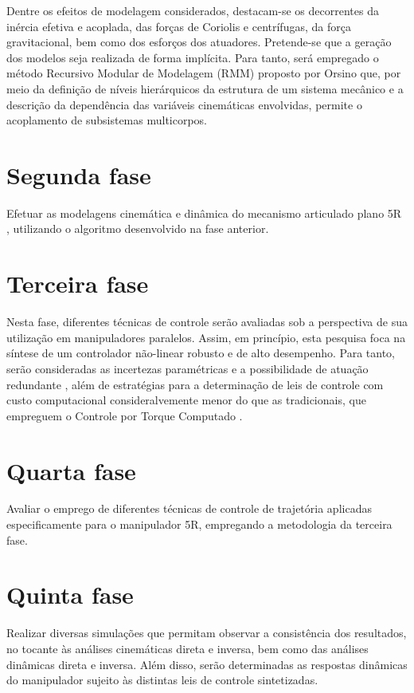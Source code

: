 \documentclass[]{politex}
\begin{document}
Dentre os efeitos de modelagem considerados, destacam-se os decorrentes da inércia efetiva e acoplada, das forças de Coriolis e centrífugas, da força gravitacional, bem como dos esforços dos atuadores. Pretende-se que a geração dos modelos seja realizada de forma implícita. Para tanto, será empregado o método Recursivo Modular de Modelagem (RMM) proposto por Orsino \cite{23orsino} que, por meio da definição de níveis hierárquicos da estrutura de um sistema mecânico e a descrição da dependência das variáveis cinemáticas envolvidas,  permite o acoplamento de subsistemas multicorpos.

\section{Segunda fase} 
Efetuar as modelagens cinemática e dinâmica do mecanismo articulado plano 5R \cite{22orsino}, utilizando o algoritmo desenvolvido na fase anterior.

\section{Terceira fase} 
Nesta fase, diferentes técnicas de controle serão avaliadas sob a perspectiva de sua utilização em manipuladores paralelos. Assim, 
em princípio, esta pesquisa foca na síntese de um controlador não-linear robusto e de alto desempenho. Para tanto, serão consideradas as incertezas paramétricas e a possibilidade de atuação redundante \cite{Cheng}, além de estratégias para a determinação de leis de controle com custo computacional
consideralvemente menor do que as tradicionais, que empreguem o Controle por Torque Computado \cite{Craig, Zubizarreta}.

\section{Quarta fase} Avaliar o emprego de diferentes técnicas de controle de trajetória aplicadas especificamente para o manipulador 5R,
empregando a metodologia da terceira fase.

\section{Quinta fase} Realizar diversas simulações que permitam observar a consistência dos resultados, no tocante às análises cinemáticas direta e inversa, bem como das análises dinâmicas direta e inversa. Além disso, serão determinadas as respostas dinâmicas do manipulador sujeito às distintas leis de controle sintetizadas.
\end{document}
